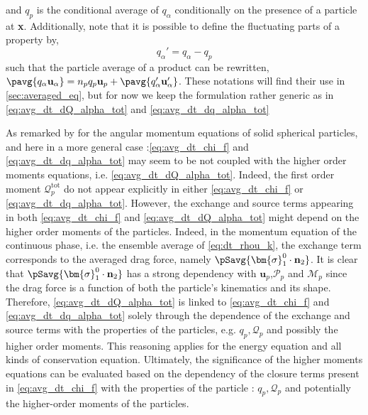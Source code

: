 and $q_p$ is the conditional average of $q_\alpha$ conditionally on the presence of a particle at \textbf{x}. 
Additionally, note that it is possible to define the fluctuating parts of a property by, 
\begin{equation}
    q_\alpha' = q_\alpha - q_p
\end{equation}
such that the particle average of a product can be rewritten, $\pavg{q_\alpha\textbf{u}_\alpha} = n_p q_p \textbf{u}_p + \pavg{q_\alpha' \textbf{u}_\alpha'}$. 
These notations will find their use in \ref{sec:averaged_eq}, but for now we keep the formulation rather generic as in \ref{eq:avg_dt_dQ_alpha_tot} and \ref{eq:avg_dt_dq_alpha_tot}

As remarked by \citet{jackson1997locally} for the angular momentum equations of solid spherical particles, and here in a more general case :\ref{eq:avg_dt_chi_f} and \ref{eq:avg_dt_dq_alpha_tot} may seem to be not coupled with the higher order moments equations, i.e. \ref{eq:avg_dt_dQ_alpha_tot}. 
Indeed, the first order moment $\mathcal{Q}_p^\text{tot}$ do not appear explicitly in either \ref{eq:avg_dt_chi_f} or \ref{eq:avg_dt_dq_alpha_tot}.
However, the exchange and source terms 
appearing in both \ref{eq:avg_dt_chi_f} and \ref{eq:avg_dt_dQ_alpha_tot} might depend on the higher order moments of the particles.
Indeed, in the momentum equation of the continuous phase, i.e. the ensemble average of \ref{eq:dt_rhou_k}, the exchange term corresponds to the averaged drag force, namely $\pSavg{\bm{\sigma}_1^0\cdot \textbf{n}_2}$. 
It is clear that $\pSavg{\bm{\sigma}_1^0\cdot \textbf{n}_2}$ has a strong dependency with $\textbf{u}_p$,$\mathcal{P}_p$ and $\mathcal{M}_p$ since the drag force is a function of both the particle's kinematics   and its shape. 
Therefore, \ref{eq:avg_dt_dQ_alpha_tot} is linked to \ref{eq:avg_dt_chi_f} and \ref{eq:avg_dt_dq_alpha_tot} solely through the dependence of the exchange and source terms with the properties of the particles, e.g. $q_p,\mathcal{Q}_p$ and possibly the higher order moments. 
This reasoning applies for the energy equation and all kinds of conservation equation. 
Ultimately, the significance of the higher moments equations can be evaluated based on the dependency of the closure terms present in \ref{eq:avg_dt_chi_f} with the properties of the particle : $q_p, \mathcal{Q}_p$ and potentially the higher-order moments of the particles. 

